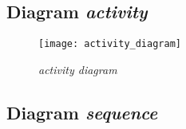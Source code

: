 


\subsection{Diagram \emph{activity}}

\begin{figure}[ht]
	\centering
	\texttt{[image: activity\_diagram]}
	\caption{\emph{activity diagram}}
	\label{fig:activity_diagram}
\end{figure}

\subsection{Diagram \emph{sequence}}
